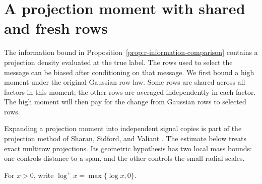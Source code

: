 \section{A projection moment with shared and fresh rows}
\label{sec:r-mixed-moments}

The information bound in
Proposition~\ref{prop:r-information-comparison} contains a projection
density evaluated at the true label.  The rows used to select the
message can be biased after conditioning on that message.  We first
bound a high moment under the original Gaussian row law.  Some rows
are shared across all factors in this moment; the other rows are
averaged independently in each factor.  The high moment will then
pay for the change from Gaussian rows to selected rows.

Expanding a projection moment into independent signal copies is part
of the projection method of Sharan, Sidford, and Valiant
\cite[Section~7, Lemma~12]{SSV2019}.  The estimate below treats exact
multirow projections.  Its geometric hypothesis has two local mass
bounds: one controls distance to a span, and the other controls the
small radial scales.

For \(x>0\), write \(\log^+x=\max\{\log x,0\}\).

